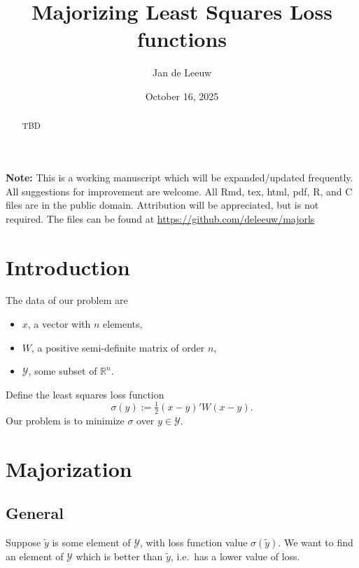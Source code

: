 \documentclass[
  12pt,
  letterpaper,
  DIV=11,
  numbers=noendperiod]{scrartcl}
\title{Majorizing Least Squares Loss functions}
\author{Jan de Leeuw}
\date{October 16, 2025}
\providecommand{\tightlist}{%
  \setlength{\itemsep}{0pt}\setlength{\parskip}{0pt}}
\newcommand{\sectionbreak}{\clearpage}
\renewcommand*\contentsname{Table of contents}
\newcommand\contentsname{Table of contents}
\theoremstyle{plain}
\theoremstyle{remark}
\begin{document}
\maketitle
\begin{abstract}
TBD
\end{abstract}

\renewcommand*\contentsname{Table of contents}
{
\hypersetup{linkcolor=}
\setcounter{tocdepth}{3}
\tableofcontents
}

\sectionbreak

\textbf{Note:} This is a working manuscript which will be
expanded/updated frequently. All suggestions for improvement are
welcome. All Rmd, tex, html, pdf, R, and C files are in the public
domain. Attribution will be appreciated, but is not required. The files
can be found at \url{https://github.com/deleeuw/majorls}

\sectionbreak

\section{Introduction}\label{introduction}

The data of our problem are

\begin{itemize}
\tightlist
\item
  \(x\), a vector with \(n\) elements,
\item
  \(W\), a positive semi-definite matrix of order \(n\),
\item
  \(\mathcal{Y}\), some subset of \(\mathbb{R}^n\).
\end{itemize}

Define the least squares loss function \[
\sigma(y):=\tfrac12(x-y)'W(x-y).
\] Our problem is to minimize \(\sigma\) over \(y\in\mathcal{Y}\).

\sectionbreak

\section{Majorization}\label{majorization}

\subsection{General}\label{general}

Suppose \(\tilde y\) is some element of \(\mathcal{Y}\), with loss
function value \(\sigma(\tilde y)\). We want to find an element of
\(\mathcal{Y}\) which is better than \(\tilde y\), i.e.~has a lower
value of loss.
\end{document}

